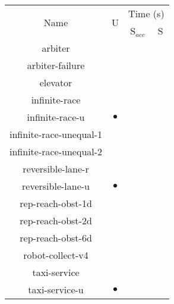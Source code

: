 \begin{tabular}{|c|c||c|c|}
\hline
\multirow{2}{*}{Name} & \multirow{2}{*}{U} & \multicolumn{2}{c|}{Time (s)}\\\cline{3-4}
& & S$_{\textit{acc}}$ & S\\\hline\hline
\textsf{arbiter} & {} &  & \\\hline
\textsf{arbiter-failure} & {} &  & \\\hline
\textsf{elevator} & {} &  & \\\hline
\textsf{infinite-race} & {} &  & \\\hline
\textsf{infinite-race-u} & {$\bullet$} &  & \\\hline
\textsf{infinite-race-unequal-1} & {} &  & \\\hline
\textsf{infinite-race-unequal-2} & {} &  & \\\hline
\textsf{reversible-lane-r} & {} &  & \\\hline
\textsf{reversible-lane-u} & {$\bullet$} &  & \\\hline
\textsf{rep-reach-obst-1d} & {} &  & \\\hline
\textsf{rep-reach-obst-2d} & {} &  & \\\hline
\textsf{rep-reach-obst-6d} & {} &  & \\\hline
\textsf{robot-collect-v4} & {} &  & \\\hline
\textsf{taxi-service} & {} &  & \\\hline
\textsf{taxi-service-u} & {$\bullet$} &  & \\\hline

\end{tabular}